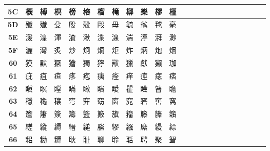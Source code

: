 \begin{table}[H]
{\begin{tabular}{|Sc|Sc|Sc|Sc|Sc|Sc|Sc|Sc|Sc|Sc|Sc|Sc|}
\textbf{5C} & 樮 & 榑 & 榠 & 榜 & 榕 & 榴 & 槞 & 槨 & 樂 & 樛 & 槿 \\ \hline
\textbf{5D} & 殲 & 殱 & 殳 & 殷 & 殼 & 毆 & 毋 & 毓 & 毟 & 毬 & 毫 \\ \hline
\textbf{5E} & 湲 & 湟 & 渾 & 渣 & 湫 & 渫 & 湶 & 湍 & 渟 & 湃 & 渺 \\ \hline
\textbf{5F} & 灑 & 灣 & 炙 & 炒 & 炯 & 烱 & 炬 & 炸 & 炳 & 炮 & 烟 \\ \hline
\textbf{60} & 獏 & 默 & 獗 & 獪 & 獨 & 獰 & 獸 & 獵 & 獻 & 獺 & 珈 \\ \hline
\textbf{61} & 疵 & 疽 & 疸 & 疼 & 疱 & 痍 & 痊 & 痒 & 痙 & 痣 & 痞 \\ \hline
\textbf{62} & 瞋 & 瞑 & 瞠 & 瞞 & 瞰 & 瞶 & 瞹 & 瞿 & 瞼 & 瞽 & 瞻 \\ \hline
\textbf{63} & 穩 & 龝 & 穰 & 穹 & 穽 & 窈 & 窗 & 窕 & 窘 & 窖 & 窩 \\ \hline
\textbf{64} & 簷 & 簫 & 簽 & 籌 & 籃 & 籔 & 籏 & 籀 & 籐 & 籘 & 籟 \\ \hline
\textbf{65} & 縒 & 縱 & 縟 & 縉 & 縋 & 縢 & 繆 & 繦 & 縻 & 縵 & 縹 \\ \hline
\textbf{66} & 耜 & 耡 & 耨 & 耿 & 耻 & 聊 & 聆 & 聒 & 聘 & 聚 & 聟 \\ \hline
\end{tabular}
}
\end{table}

